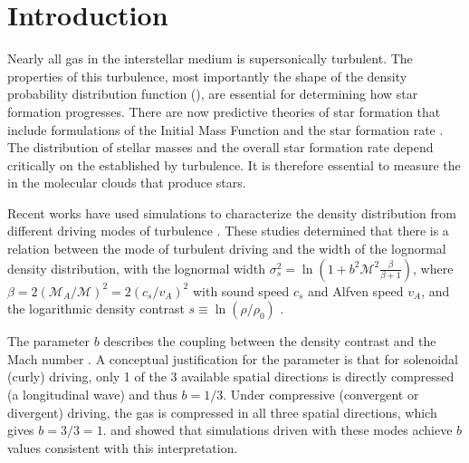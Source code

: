 

\ifstandalone


\fi

% 

\section{Introduction}
Nearly all gas in the interstellar medium is supersonically turbulent.  The
properties of this turbulence, most importantly the shape of the density
probability distribution function (\rhoPDF), are essential for determining how star
formation progresses.
There are now predictive theories of star formation that include formulations
of the Initial Mass Function \citep[IMF;][]{Padoan2002a, Padoan2007a, Hennebelle2008a, Hennebelle2009a, Chabrier2010a, 
Elmegreen2011a, Hopkins2012b, Hennebelle2013a} and the star
formation rate
\citep[SFR;][]{Krumholz2005c,  Hennebelle2011a,
Padoan2011b, Krumholz2012b, Federrath2012a, Padoan2012a}.
The distribution of stellar masses and the overall star formation rate depend
critically on the \rhoPDF established by turbulence.  It is therefore essential to
measure the \rhoPDF in the molecular clouds that produce stars.

Recent works have used simulations to characterize the density distribution
from different driving modes of turbulence
\citep{Federrath2008a,Federrath2009a,Federrath2010a,Federrath2011a,Price2011b,Federrath2013a}.
These studies determined that there is a relation between the mode of turbulent driving and the width
of the lognormal density distribution, with the lognormal width $\sigma_{s}^2 = \ln\left(1+b^2
\mathcal{M}^2 \frac{\beta}{\beta+1}\right)$, where $\beta=2 (\mathcal{M}_A /
\mathcal{M})^2 = 2 (c_s/v_A)^2$ with sound speed $c_s$ and Alfven speed $v_A$,
and the logarithmic density contrast $s\equiv\ln(\rho/\rho_0)$ 
\citep[the $s$ in $c_s$ is unrelated; ][]{Padoan2011b,Molina2012a}.

The parameter $b$ describes the coupling between the density contrast and the
Mach number \citep{Federrath2008a,Federrath2010a}.  A conceptual justification
for the parameter is that for solenoidal (curly) driving, only 1 of the 3
available spatial directions is directly compressed (a longitudinal wave) and
thus $b=1/3$. Under compressive (convergent or divergent) driving, the gas is
compressed in all three spatial directions, which gives $b=3/3=1$.
\citet{Federrath2008a} and \citet{Federrath2010a} showed that simulations
driven with these modes achieve $b$ values consistent with this interpretation.


